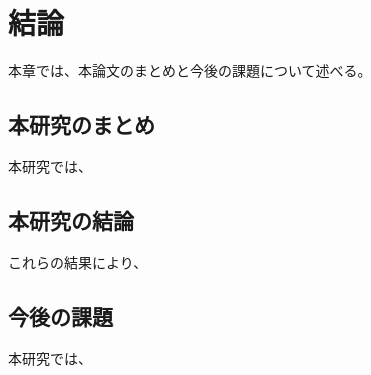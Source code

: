 \chapter{結論}
\label{chap:conclusion}
本章では、本論文のまとめと今後の課題について述べる。

\section{本研究のまとめ}
\label{section:conclusion}
本研究では、

\section{本研究の結論}
これらの結果により、

\section{今後の課題}
本研究では、
